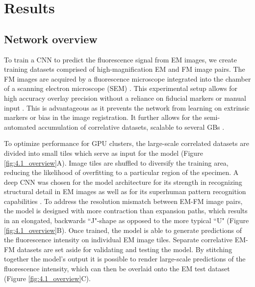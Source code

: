 \section{Results}
\label{sec:4.2_results}

\subsection{Network overview}
\label{sec:4results_overview}

To train a CNN to predict the fluorescence signal from EM images, we create training datasets comprised of high-magnification EM and FM image pairs. The FM images are acquired by a fluorescence microscope integrated into the chamber of a scanning electron microscope (SEM) \cite{liv2013simultaneous, zonnevylle2013integration}. This experimental setup allows for high accuracy overlay precision without a reliance on fiducial markers or manual input \cite{haring2017automated}. This is advantageous as it prevents the network from learning on extrinsic markers or bias in the image registration. It further allows for the semi-automated accumulation of correlative datasets, scalable to several GBs \cite{lane2021optimization}.

To optimize performance for GPU clusters, the large-scale correlated datasets are divided into small tiles which serve as input for the model (Figure \ref{fig:4.1_overview}A). Image tiles are shuffled to diversify the training area, reducing the likelihood of overfitting to a particular region of the specimen. A deep CNN was chosen for the model architecture for its strength in recognizing structural detail in EM images as well as for its superhuman pattern recognition capabilities \cite{cciccek20163d}. To address the resolution mismatch between EM-FM image pairs, the model is designed with more contraction than expansion paths, which results in an elongated, backwards ``J"-shape as opposed to the more typical ``U" (Figure \ref{fig:4.1_overview}B). Once trained, the model is able to generate predictions of the fluorescence intensity on individual EM image tiles. Separate correlative EM-FM datasets are set aside for validating and testing the model. By stitching together the model's output it is possible to render large-scale predictions of the fluorescence intensity, which can then be overlaid onto the EM test dataset (Figure \ref{fig:4.1_overview}C).

